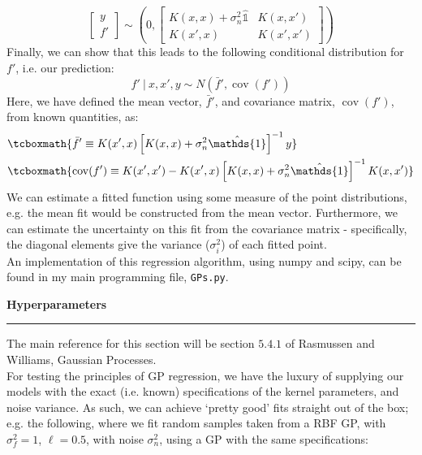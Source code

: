 \documentclass[12pt]{article}
\newcommand{\minisection}[1]{
    \par\vspace{0.25cm}
    \textbf{#1}\par
    \vspace{0.1cm}
    \hrule
    \vspace{0.25cm}
}
\DeclareMathOperator{\cov}{cov}
\newcommand{\idop}{\hat{\mathds{1}}}
\begin{document}
    \begin{equation*}
        \begin{bmatrix}
            y\\ f'
        \end{bmatrix}\sim\left(
            0,\begin{bmatrix}
                K(x,x) + \sigma_n^2\idop & K(x,x')\\
                K(x',x) & K(x',x')
            \end{bmatrix}
        \right)
    \end{equation*}
    Finally, we can show that this leads to the following conditional distribution for $f'$, i.e. our prediction:
    \begin{equation*}
        f'\ |\ x,x',y \sim N(\bar f',\cov(f'))
    \end{equation*}
    Here, we have defined the mean vector, $\bar f'$, and covariance matrix, $\cov(f')$, from known quantities, as:
    \begin{align*}
        &\tcboxmath{\bar f' \equiv K(x',x)\left[ K(x,x) + \sigma_n^2\idop\right]^{-1}y}\\
        &\tcboxmath{\cov(f') \equiv K(x',x') - K(x',x)\left[ K(x,x) + \sigma_n^2\idop\right]^{-1} K(x,x')}
    \end{align*}
    We can estimate a fitted function using some measure of the point distributions, e.g. the mean fit would be constructed from the mean vector. Furthermore, we can estimate the uncertainty on this fit from the covariance matrix - specifically, the diagonal elements give the variance ($\sigma_i^2$) of each fitted point.\\
    An implementation of this regression algorithm, using numpy and scipy, can be found in my main programming file, \verb|GPs.py|.
    \minisection{Hyperparameters}
    The main reference for this section will be section $5.4.1$ of Rasmussen and Williams, Gaussian Processes.\\
    For testing the principles of GP regression, we have the luxury of supplying our models with the exact (i.e. known) specifications of the kernel parameters, and noise variance. As such, we can achieve `pretty good' fits straight out of the box; e.g. the following, where we fit random samples taken from a RBF GP, with $\sigma^2_f=1$, $\ell=0.5$, with noise $\sigma_n^2$, using a GP with the same specifications:
\end{document}
